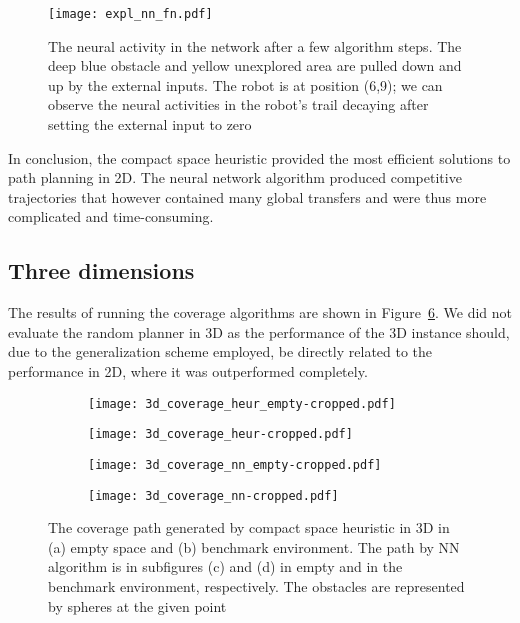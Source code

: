 \documentclass[buriama8_dp.tex]{subfiles}
\begin{document}
\begin{figure}[ht]
  \centering
  \texttt{[image: expl\_nn\_fn.pdf]}
  \caption[Internal state of neural network algorithm]{The neural activity in the network after a few algorithm steps. The deep blue obstacle and yellow unexplored area are pulled down and up by the external inputs. The robot is at position (6,9); we can observe the neural activities in the robot's trail decaying after setting the external input to zero}
  \label{fig:nn_fn}
\end{figure}


In conclusion, the compact space heuristic provided the most efficient solutions to path planning in 2D. The neural network algorithm produced competitive trajectories that however contained many global transfers and were thus more complicated and time-consuming.

\subsection{Three dimensions}
\label{subsec:3d_sim}

The results of running the coverage algorithms are shown in Figure~\ref{fig:heur_3d_coverage}. We did not evaluate the random planner in 3D as the performance of the 3D instance should, due to the generalization scheme employed, be directly related to the performance in 2D, where it was outperformed completely. 

\begin{figure}[tp]
  \centering
  \begin{subfigure}[t]{0.48\textwidth}
    \texttt{[image: 3d\_coverage\_heur\_empty-cropped.pdf]}
    \caption{}
    \label{fig:heur_3d_empty}
  \end{subfigure}
  \;
  \begin{subfigure}[t]{0.48\textwidth}
    \texttt{[image: 3d\_coverage\_heur-cropped.pdf]}
    \caption{}
    \label{fig:heur_3d_env}
  \end{subfigure}
  
 \begin{subfigure}[t]{0.48\textwidth}
    \texttt{[image: 3d\_coverage\_nn\_empty-cropped.pdf]}
    \caption{}
    \label{fig:nn_3d_empty}
  \end{subfigure}
  \;
  \begin{subfigure}[t]{0.48\textwidth}
    \texttt{[image: 3d\_coverage\_nn-cropped.pdf]}
    \caption{}
    \label{fig:nn_3d_env}
  \end{subfigure}
  
  \caption[Coverage path -- compact space heuristic in 3D]{The coverage path generated  by compact space heuristic in 3D in (a) empty space and (b) benchmark environment. The path by NN algorithm is in subfigures (c) and (d) in empty and in the benchmark environment, respectively. The obstacles are represented by spheres at the given point}
  \label{fig:heur_3d_coverage}
\end{figure}
\end{document}
